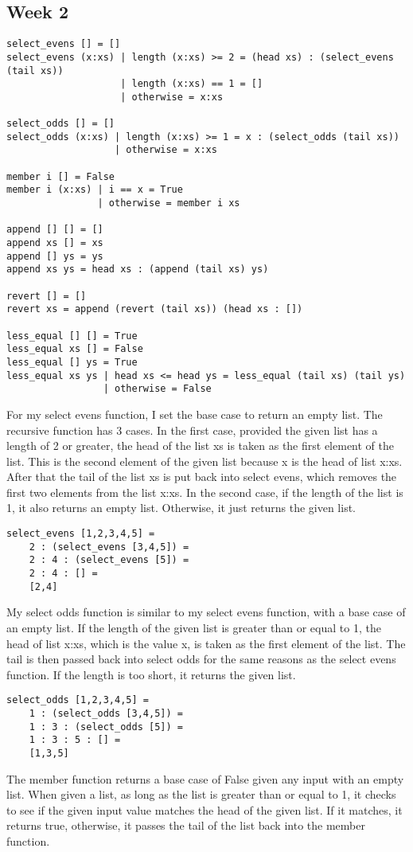 \documentclass{article}
\theoremstyle{theorem}
\theoremstyle{definition}
\theoremstyle{remark}
\begin{document}
\subsection{Week 2}

\begin{lstlisting}
select_evens [] = []
select_evens (x:xs) | length (x:xs) >= 2 = (head xs) : (select_evens (tail xs))
                    | length (x:xs) == 1 = []
                    | otherwise = x:xs

select_odds [] = []
select_odds (x:xs) | length (x:xs) >= 1 = x : (select_odds (tail xs))
                   | otherwise = x:xs

member i [] = False
member i (x:xs) | i == x = True
                | otherwise = member i xs

append [] [] = []
append xs [] = xs
append [] ys = ys
append xs ys = head xs : (append (tail xs) ys)

revert [] = []
revert xs = append (revert (tail xs)) (head xs : [])

less_equal [] [] = True
less_equal xs [] = False
less_equal [] ys = True
less_equal xs ys | head xs <= head ys = less_equal (tail xs) (tail ys)
                 | otherwise = False
\end{lstlisting}
%
For my select evens function, I set the base case to return an empty list. The recursive function has 3 cases. In the first case, provided the given list has a length of 2 or greater, the head of the list xs is taken as the first element of the list. This is the second element of the given list because x is the head of list x:xs. After that the tail of the list xs is put back into select evens, which removes the first two elements from the list x:xs. In the second case, if the length of the list is 1, it also returns an empty list. Otherwise, it just returns the given list.

\begin{lstlisting}
select_evens [1,2,3,4,5] =
	2 : (select_evens [3,4,5]) =
	2 : 4 : (select_evens [5]) =
	2 : 4 : [] =
	[2,4]
\end{lstlisting}
%
My select odds function is similar to my select evens function, with a base case of an empty list. If the length of the given list is greater than or equal to 1, the head of list x:xs, which is the value x, is taken as the first element of the list. The tail is then passed back into select odds for the same reasons as the select evens function. If the length is too short, it returns the given list.

\begin{lstlisting}
select_odds [1,2,3,4,5] =
	1 : (select_odds [3,4,5]) =
	1 : 3 : (select_odds [5]) =
	1 : 3 : 5 : [] =
	[1,3,5]
\end{lstlisting}
%
The member function returns a base case of False given any input with an empty list. When given a list, as long as the list is greater than or equal to 1, it checks to see if the given input value matches the head of the given list. If it matches, it returns true, otherwise, it passes the tail of the list back into the member function.
\end{document}
